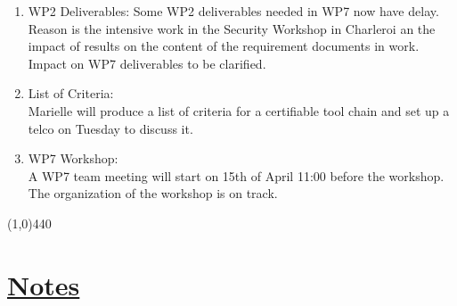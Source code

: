 \documentclass[a4paper]{article}
\begin{document}
\begin{enumerate}

\item WP2 Deliverables:
Some WP2 deliverables needed in WP7 now have delay. Reason is the intensive work in the Security Workshop in Charleroi an the impact of results on the content of the requirement documents in work.\\
Impact on WP7 deliverables to be clarified.
\item List of Criteria:\\
Marielle will produce a list of criteria for a certifiable tool chain and set up a telco on Tuesday to discuss it.
\item WP7 Workshop:\\
A WP7 team meeting will start on 15th of April 11:00 before the workshop.
The organization of the workshop is on track.

\end{enumerate}

\line(1,0){440}
\section*{\underline{Notes}}
\end{document}
